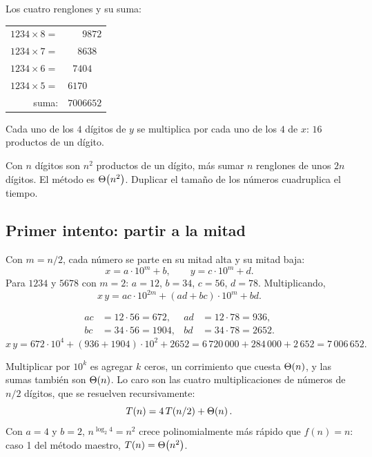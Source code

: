 \documentclass[11pt,letterpaper]{article}
\begin{document}
\begin{ejemplo}[$1234 \times 5678$]
  Los cuatro renglones y su suma:
  \begin{center}
  \begin{tabular}{rl}
    $1234 \times 8 =$ & $\phantom{000}9872$ \\
    $1234 \times 7 =$ & $\phantom{00}8638\phantom{0}$ \\
    $1234 \times 6 =$ & $\phantom{0}7404\phantom{00}$ \\
    $1234 \times 5 =$ & $6170\phantom{000}$ \\
    \midrule
    suma: & $7006652$
  \end{tabular}
  \end{center}
  Cada uno de los $4$ dígitos de $y$ se multiplica por cada uno de los
  $4$ de $x$: $16$ productos de un dígito.
\end{ejemplo}

Con $n$ dígitos son $n^2$ productos de un dígito, más sumar $n$
renglones de unos $2n$ dígitos. El método es $\Theta\!\left(n^2\right)$. Duplicar el
tamaño de los números cuadruplica el tiempo.


\subsection*{Primer intento: partir a la mitad}

Con $m = n/2$, cada número se parte en su mitad alta y su mitad baja:
\[
  x = a \cdot 10^{m} + b , \qquad y = c \cdot 10^{m} + d .
\]
Para $1234$ y $5678$ con $m = 2$: $a = 12$, $b = 34$, $c = 56$,
$d = 78$. Multiplicando,
\[
  x\,y = ac \cdot 10^{2m} + (ad + bc) \cdot 10^{m} + bd .
\]

\begin{ejemplo}
  \begin{align*}
    ac &= 12 \cdot 56 = 672 , &
    ad &= 12 \cdot 78 = 936 , \\
    bc &= 34 \cdot 56 = 1904 , &
    bd &= 34 \cdot 78 = 2652 .
  \end{align*}
  \[
    x\,y = 672 \cdot 10^{4} + (936 + 1904) \cdot 10^{2} + 2652
        = 6\,720\,000 + 284\,000 + 2\,652 = 7\,006\,652 .
  \]
\end{ejemplo}

Multiplicar por $10^{k}$ es agregar $k$ ceros, un corrimiento que cuesta
$\Theta\!\left(n\right)$, y las sumas también son $\Theta\!\left(n\right)$. Lo caro son las cuatro
multiplicaciones de números de $n/2$ dígitos, que se resuelven
recursivamente:
\[
  T(n) = 4\, T(n/2) + \Theta\!\left(n\right) .
\]
Con $a = 4$ y $b = 2$, $n^{\log_2 4} = n^2$ crece polinomialmente más
rápido que $f(n) = n$: caso 1 del método maestro,
$T(n) = \Theta\!\left(n^2\right)$.
\end{document}
